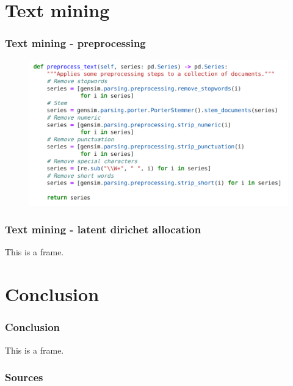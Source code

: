 \documentclass{beamer}
\begin{document}
\section{Text mining}
\begin{frame}
\frametitle{Text mining - preprocessing}

\begin{figure}
\includegraphics[width=0.6\linewidth]{../visualizations/preprocess_text_code.png}
\end{figure}

\end{frame}


\begin{frame}

\frametitle{Text mining - latent dirichet allocation}
This is a frame.

\end{frame}

\section{Conclusion}
\begin{frame}
\frametitle{Conclusion}
This is a frame.
\end{frame}

\begin{frame}
\frametitle{Sources}
\end{frame}
\end{document}
